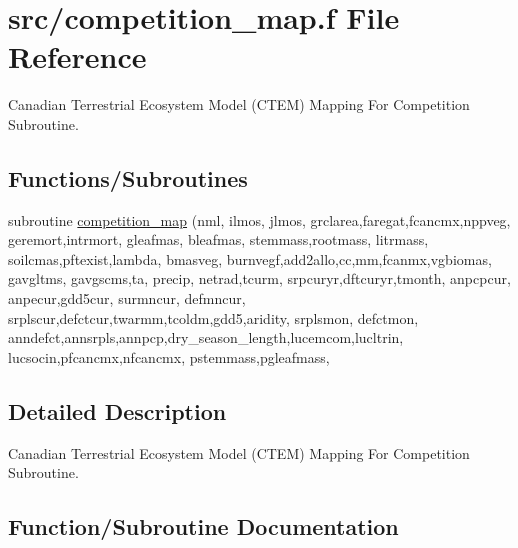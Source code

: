 \hypertarget{competition__map_8f}{}\section{src/competition\+\_\+map.f File Reference}
\label{competition__map_8f}


Canadian Terrestrial Ecosystem Model (C\+T\+E\+M) Mapping For Competition Subroutine.  


\subsection*{Functions/\+Subroutines}
\begin{DoxyCompactItemize}
\item 
subroutine \hyperlink{competition__map_8f_a854a6eedf534eff4dd50075b3a321744}{competition\+\_\+map} (nml, ilmos, jlmos, grclarea,faregat,fcancmx,nppveg, geremort,intrmort, gleafmas, bleafmas, stemmass,rootmass, litrmass, soilcmas,pftexist,lambda, bmasveg, burnvegf,add2allo,cc,mm,fcanmx,vgbiomas, gavgltms, gavgscms,ta, precip, netrad,tcurm, srpcuryr,dftcuryr,tmonth, anpcpcur, anpecur,gdd5cur, surmncur, defmncur, srplscur,defctcur,twarmm,tcoldm,gdd5,aridity, srplsmon, defctmon, anndefct,annsrpls,annpcp,dry\+\_\+season\+\_\+length,lucemcom,lucltrin, lucsocin,pfcancmx,nfcancmx, pstemmass,pgleafmass,
\end{DoxyCompactItemize}


\subsection{Detailed Description}
Canadian Terrestrial Ecosystem Model (C\+T\+E\+M) Mapping For Competition Subroutine. 



\subsection{Function/\+Subroutine Documentation}
\hypertarget{competition__map_8f_a854a6eedf534eff4dd50075b3a321744}{}

